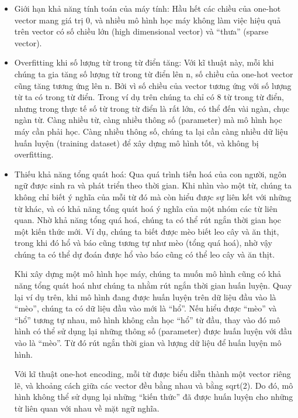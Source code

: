 \begin{itemize}
    \item Giới hạn khả năng tính toán của máy tính: Hầu hết các chiều của one-hot vector mang giá trị 0, và nhiều mô hình học máy không làm việc hiệu quả trên vector có số chiều lớn (high dimensional vector) và “thưa” (sparse vector).

    \item Overfitting khi số lượng từ trong từ điển tăng: Với kĩ thuật này, mỗi khi chúng ta gia tăng số lượng từ trong từ điển lên n, số chiều của one-hot vector cũng tăng tương ứng lên n. Bởi vì số chiều của vector tương ứng với số lượng từ ta có trong từ điển. Trong ví dụ trên chúng ta chỉ có 8 từ trong từ điển, nhưng trong thực tế số từ trong từ điển là rất lớn, có thể đến vài ngàn, chục ngàn từ. Càng nhiều từ, càng nhiều thông số (parameter) mà mô hình học máy cần phải học. Càng nhiều thông số, chúng ta lại cần càng nhiều dữ liệu huấn luyện (training dataset) để xây dựng mô hình tốt, và không bị overfitting.

    \item Thiếu khả năng tổng quát hoá: Qua quá trình tiến hoá của con người, ngôn ngữ được sinh ra và phát triển theo thời gian. Khi nhìn vào một từ, chúng ta không chỉ biết ý nghĩa của mỗi từ đó mà còn hiểu được sự liên kết với những từ khác, và có khả năng tổng quát hoá ý nghĩa của một nhóm các từ liên quan. Nhờ khả năng tổng quá hoá, chúng ta có thể rút ngắn thời gian học một kiến thức mới. Ví dụ, chúng ta biết được mèo biết leo cây và ăn thịt, trong khi đó hổ và báo cũng tương tự như mèo (tổng quá hoá), nhờ vậy chúng ta có thể dự đoán được hổ vào báo cũng có thể leo cây và ăn thịt.

    Khi xây dựng một mô hình học máy, chúng ta muốn mô hình cũng có khả năng tổng quát hoá như chúng ta nhằm rút ngắn thời gian huấn luyện. Quay lại ví dụ trên, khi mô hình đang được huấn luyện trên dữ liệu đầu vào là “mèo”, chúng ta có dữ liệu đầu vào mới là “hổ”. Nếu hiểu được “mèo” và “hổ” tương tự nhau, mô hình không cần học “hổ” từ đầu, thay vào đó mô hình có thể sử dụng lại những thông số (parameter) được huấn luyện với đầu vào là “mèo”. Từ đó rút ngắn thời gian và lượng dữ liệu để huấn luyện mô hình.

    Với kĩ thuật one-hot encoding, mỗi từ được biểu diễn thành một vector riêng lẽ, và khoảng cách giữa các vector đều bằng nhau và bằng sqrt(2). Do đó, mô hình không thể sử dụng lại những “kiến thức” đã được huấn luyện cho những từ liên quan với nhau về mặt ngữ nghĩa.

\end{itemize}

